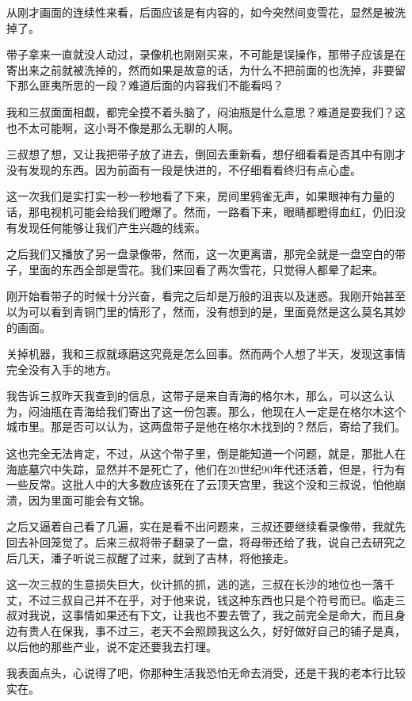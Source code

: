 从刚才画面的连续性来看，后面应该是有内容的，如今突然间变雪花，显然是被洗掉了。

带子拿来一直就没人动过，录像机也刚刚买来，不可能是误操作，那带子应该是在寄出来之前就被洗掉的，然而如果是故意的话，为什么不把前面的也洗掉，非要留下那么匪夷所思的一段？难道后面的内容我们不能看吗？

我和三叔面面相觑，都完全摸不着头脑了，闷油瓶是什么意思？难道是耍我们？这也不太可能啊，这小哥不像是那么无聊的人啊。

三叔想了想，又让我把带子放了进去，倒回去重新看，想仔细看看是否其中有刚才没有发现的东西。因为前面有一段是快进的，不仔细看看终归有点心虚。

这一次我们是实打实一秒一秒地看了下来，房间里鸦雀无声，如果眼神有力量的话，那电视机可能会给我们瞪爆了。然而，一路看下来，眼睛都瞪得血红，仍旧没有发现任何能够让我们产生兴趣的线索。

之后我们又播放了另一盘录像带，然而，这一次更离谱，那完全就是一盘空白的带子，里面的东西全部是雪花。我们来回看了两次雪花，只觉得人都晕了起来。

刚开始看带子的时候十分兴奋，看完之后却是万般的沮丧以及迷惑。我刚开始甚至以为可以看到青铜门里的情形了，然而，没有想到的是，里面竟然是这么莫名其妙的画面。

关掉机器，我和三叔就琢磨这究竟是怎么回事。然而两个人想了半天，发现这事情完全没有入手的地方。

我告诉三叔昨天我查到的信息，这带子是来自青海的格尔木，那么，可以这么认为，闷油瓶在青海给我们寄出了这一份包裹。那么，他现在人一定是在格尔木这个城市里。那是否可以认为，这两盘带子是他在格尔木找到的？然后，寄给了我们。

这也完全无法肯定，不过，从这个带子里，倒是能知道一个问题，就是，那批人在海底墓穴中失踪，显然并不是死亡了，他们在20世纪90年代还活着，但是，行为有一些反常。这批人中的大多数应该死在了云顶天宫里，我这个没和三叔说，怕他崩溃，因为里面可能会有文锦。

之后又逼着自己看了几遍，实在是看不出问题来，三叔还要继续看录像带，我就先回去补回笼觉了。后来三叔将带子翻录了一盘，将母带还给了我，说自己去研究之后几天，潘子听说三叔醒了过来，就到了吉林，将他接走。

这一次三叔的生意损失巨大，伙计抓的抓，逃的逃，三叔在长沙的地位也一落千丈，不过三叔自己并不在乎，对于他来说，钱这种东西也只是个符号而已。临走三叔对我说，这事情如果还有下文，让我也不要去管了，我之前完全是命大，而且身边有贵人在保我，事不过三，老天不会照顾我这么久，好好做好自己的铺子是真，以后他的那些产业，说不定还要我去打理。

我表面点头，心说得了吧，你那种生活我恐怕无命去消受，还是干我的老本行比较实在。

